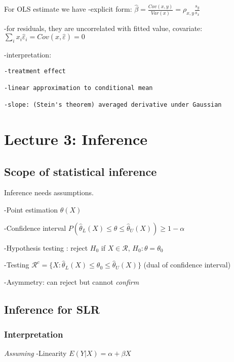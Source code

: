 \documentclass[
]{article}
\begin{document}
For OLS estimate we have -explicit form:
\(\hat{\beta}=\frac{Cov(x,y)}{Var(x)}=\rho_{x,y}\frac{s_y}{s_x}\)

-for residuals, they are uncorrelated with fitted value, covariate:
\(\sum_i x_i\hat{\varepsilon}_i=Cov(x,\hat{\varepsilon})=0\)

-interpretation:

\begin{verbatim}
-treatment effect
  
-linear approximation to conditional mean
  
-slope: (Stein's theorem) averaged derivative under Gaussian
\end{verbatim}

\hypertarget{lecture-3-inference}{%
\section{Lecture 3: Inference}\label{lecture-3-inference}}

\hypertarget{scope-of-statistical-inference}{%
\subsection{Scope of statistical
inference}\label{scope-of-statistical-inference}}

Inference needs assumptions.

-Point estimation \(\hat{\theta}(X)\)

-Confidence interval
\(P(\hat{\theta}_L(X)\leq\theta\leq\hat{\theta}_U(X))\geq 1-\alpha\)

-Hypothesis testing : reject \(H_0\) if \(X\in\mathcal{R}\),
\(H_0 :\theta=\theta_0\)

-Testing
\(\mathcal{R}^c=\{X:\hat{\theta}_L(X)\leq\theta_0\leq\hat{\theta}_U(X)\}\)
(dual of confidence interval)

-Asymmetry: can reject but cannot \emph{confirm}

\hypertarget{inference-for-slr}{%
\subsection{Inference for SLR}\label{inference-for-slr}}

\hypertarget{interpretation}{%
\subsubsection{Interpretation}\label{interpretation}}

\emph{Assuming} -Linearity \(E(Y|X)=\alpha+\beta X\)
\end{document}

